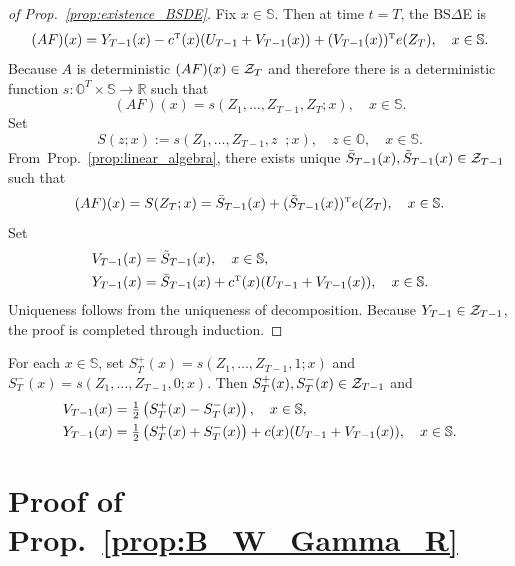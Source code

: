 \documentclass[twoside,11pt]{article}
\def\Re{\mathbb{R}}
\def\FRAC#1#2#3{\genfrac{}{}{}{#1}{#2}{#3}}
\def\half{{\mathchoice{\FRAC{1}{1}{2}}%
{\FRAC{2}{1}{2}}%
{\FRAC{3}{1}{2}}%
{\FRAC{4}{1}{2}}}}
\newcommand{\field}[1]{\mathbb{#1}}
\def\Re{\field{R}}
\def\clZ{{\cal Z}}
\def\clZ{{\cal Z}}
\def\bS{\begin{slide}}
\def\Re{\mathbb{R}}
\def\Prop#1{Prop.~\ref{#1}}
\def\clZ{{\cal Z}}
\renewcommand{\Re}{\mathbb{R}}
\def\FRAC#1#2#3{\genfrac{}{}{}{#1}{#2}{#3}}
\def\clZ{{\cal Z}}
\def\bS{\mathbb{S}}
\def\bO{\mathbb{O}}
\def\tp{{\hbox{\rm\tiny T}}}
\begin{document}
\begin{proof}[of \Prop{prop:existence_BSDE}]
 Fix $x\in \bS$.  Then at time $t=T$, the BS$\Delta$E is
  \begin{equation*}
  (AF)(x) = Y_{T-1}(x) - c^\tp(x) (U_{T-1} + V_{T-1}(x)) + (V_{T-1}(x))^\tp
  e(Z_T),\quad x\in \bS.
  \end{equation*}
  Because $A$ is deterministic $(AF)(x)\in\clZ_T$ and therefore there is a
deterministic function $s: \bO^T\times \bS \to \Re$ such that
\begin{equation*}
  (AF)(x) = s(Z_1,\hdots,Z_{T-1},Z_T;x),\quad x\in\bS.
\end{equation*}
Set
\begin{equation*}
S(z;x) := s(Z_1,\hdots,Z_{T-1},z \;\; ; x),\quad z\in\bO,\quad x\in\bS.
\end{equation*}
From~\Prop{prop:linear_algebra}, there exists unique
$\bar{S}_{T-1}(x), \tilde{S}_{T-1}(x) \in \clZ_{T-1}$ such that
\begin{equation*}
(AF)(x) = S(Z_T;x) = \bar{S}_{T-1}(x) + (\tilde{S}_{T-1}(x))^\tp
e(Z_T),\quad x\in \bS.
\end{equation*}
Set
\begin{align*}
  V_{T-1}(x) &=  \tilde{S}_{T-1}(x),\quad x\in\bS,\\
  Y_{T-1}(x) &=\bar{S}_{T-1}(x)  + c^\tp(x) (U_{T-1} + V_{T-1}(x)) ,\quad x\in\bS.
\end{align*}
Uniqueness follows from the uniqueness of decomposition.  Because
$Y_{T-1}\in\clZ_{T-1}$, the proof is completed through induction.  
\end{proof}

\begin{example}[m=1]
For each $x\in\bS$, set $
S_T^{+}(x) = s(Z_1,\hdots,Z_{T-1},1;x)$ and $S_T^{-}(x) =
s(Z_1,\hdots,Z_{T-1},0;x)$. 
Then $S_T^{+}(x), S_T^{-}(x)\in \clZ_{T-1}$ and
\begin{align*}
  V_{T-1}(x) &=  \half\left(S_T^{+} (x)- S_{T}^-(x) \right),\quad x\in\bS,\\
  Y_{T-1}(x) &= \half\left(S_T^{+}(x) + S_{T}^-(x)\right) + c(x)
               (U_{T-1} + V_{T-1}(x)),\quad x\in\bS.
\end{align*}
\end{example}



\section{Proof of \Prop{prop:B_W_Gamma_R}}
\label{appdx:formula_for_R}
\end{document}
